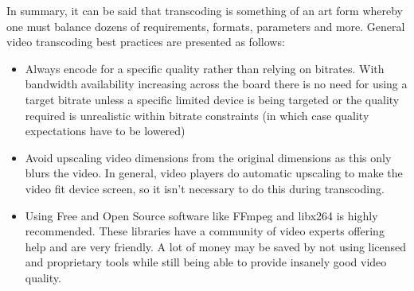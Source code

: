 \documentclass[letterpaper,12pt,titlepage,oneside,final]{report}
\begin{document}
            In summary, it can be said that transcoding is something of an art form whereby one must balance dozens of requirements, formats, parameters and more. General video transcoding best practices are presented as follows:
            \begin{itemize}
                \item{Always encode for a specific quality rather than relying on bitrates. With bandwidth availability increasing across the board there is no need for using a target bitrate unless a specific limited device is being targeted or the quality required is unrealistic within bitrate constraints (in which case quality expectations have to be lowered)}
                \item{Avoid upscaling video dimensions from the original dimensions as this only blurs the video. In general, video players do automatic upscaling to make the video fit device screen, so it isn't necessary to do this during transcoding.}
                \item{Using Free and Open Source software like FFmpeg and libx264\cite{Video68:online} is highly recommended. These libraries have a community of video experts offering help and are very friendly. A lot of money may be saved by not using licensed and proprietary tools while still being able to provide insanely good video quality.}\cite{Trans44:online}
            \end{itemize}  

        
\end{document}
